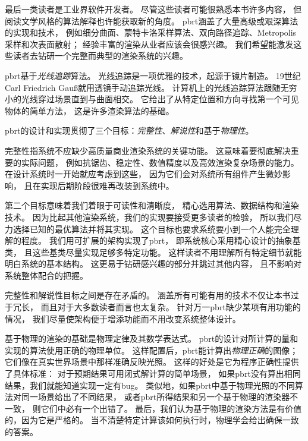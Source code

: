 最后一类读者是工业界软件开发者。
尽管这些读者可能很熟悉本书许多内容，
但阅读文学风格的算法解释也许能获取新的角度。
pbrt涵盖了大量高级或艰深算法的实现和技术，
例如细分曲面、蒙特卡洛采样算法、双向路径追踪、Metropolis采样和次表面散射；
经验丰富的渲染从业者应该会很感兴趣。
我们希望能激发这些读者去钻研一个完整而典型的渲染系统的兴趣。\\


pbrt基于{\itshape 光线追踪}算法。
光线追踪是一项优雅的技术，起源于镜片制造。
19世纪Carl Friedrich Gau{\ss}就用透镜手动追踪光线。
计算机上的光线追踪算法跟随无穷小的光线穿过场景直到与曲面相交。
它给出了从特定位置和方向寻找第一个可见物体的简单方法，
这是许多渲染算法的基础。

pbrt的设计和实现贯彻了三个目标：{\itshape 完整性}、{\itshape 解说性}和基于{\itshape 物理性}。

完整性指系统不应缺少高质量商业渲染系统的关键功能。
这意味着要彻底解决重要的实际问题，
例如抗锯齿、稳定性、数值精度以及高效渲染复杂场景的能力。
在设计系统时一开始就应考虑到这些，
因为它们会对系统所有组件产生微妙影响，
且在实现后期阶段很难再改装到系统中。

第二个目标意味着我们着眼于可读性和清晰度，
精心选用算法、数据结构和渲染技术。
因为比起其他渲染系统，我们的实现要接受更多读者的检验，
所以我们尽力选择已知的最优算法并将其实现。
这个目标也要求系统要小到一个人能完全理解的程度。
我们用可扩展的架构实现了pbrt，
即系统核心采用精心设计的抽象基类，
且这些基类尽量实现足够多特定功能。
这样读者不用理解所有特定细节就能明白系统的基本结构。
这更易于钻研感兴趣的部分并跳过其他内容，
且不影响对系统整体配合的把握。

完整性和解说性目标之间是存在矛盾的。
涵盖所有可能有用的技术不仅让本书过于冗长，
而且对于大多数读者而言也太复杂。
针对万一pbrt缺少某项有用功能的情况，
我们尽量使架构便于增添功能而不用改变系统整体设计。

基于物理的渲染的基础是物理定律及其数学表达式。
pbrt的设计对所计算的量和实现的算法使用正确的物理单位。
这样配置后，pbrt能计算出{\itshape 物理正确}的图像；
它们像在真实世界场景中那样准确反映光照。
这样的好处是它为程序正确性提供了具体标准：
对于预期结果可用闭式解计算的简单场景，
如果pbrt没有算出相同结果，我们就能知道实现一定有bug。
类似地，如果pbrt中基于物理光照的不同算法对同一场景给出了不同结果，
或者pbrt所得结果和另一个基于物理的渲染器不一致，
则它们中必有一个出错了。
最后，我们认为基于物理的渲染方法是有价值的，因为它是严格的。
当不清楚特定计算该如何执行时，物理学会给出确保一致的答案。

